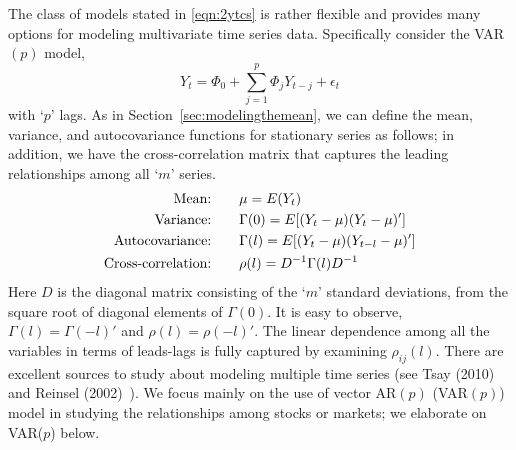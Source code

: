 The class of models stated in \eqref{eqn:2ytcs} is rather flexible and provides many options for modeling multivariate time series data. Specifically consider the VAR$(p)$ model,
	\begin{equation} \label{eqn:ytphi0}
	Y_{t} = \Phi_0 + \sum_{j=1}^{p} \Phi_jY_{t-j} + \epsilon_t 
	\end{equation}
with `$p$' lags. As in Section~\ref{sec:modelingthemean}, we can define the mean, variance, and autocovariance functions for stationary series as follows; in addition, we have the cross-correlation matrix that captures the leading relationships among all `$m$' series.
	\begin{equation} \label{eq:meanvarianceauto}
        \begin{split}
	\text{Mean:\qquad} & \mu= E(Y_t) \\
	\text{Variance:\qquad} & \Gamma(0)= E[(Y_t - \mu)(Y_t - \mu)'] \\
	\text{Autocovariance:\qquad} & \Gamma(l)= E[(Y_t - \mu)(Y_{t-l} - \mu)'] \\
	\text{Cross-correlation:\qquad} & \rho(l) = D^{-1}\Gamma(l) D^{-1}
        \end{split}
        \end{equation}
Here $D$ is the diagonal matrix consisting of the `$m$' standard deviations, from the square root of diagonal elements of $\Gamma(0)$. It is easy to observe,  $\Gamma(l)= \Gamma(-l)'$ and $\rho(l)= \rho(-l)'$. The linear dependence among all the variables in terms of leads-lags is fully captured by examining $\rho_{ij}(l)$. There are excellent sources to study about modeling multiple time series (see Tsay (2010)~\cite{tsay} and Reinsel (2002)~\cite{2002reinsel}). We focus mainly on the use of vector AR$(p)$ (VAR$(p)$) model in studying the relationships among stocks or markets; we elaborate on VAR($p$) below.


